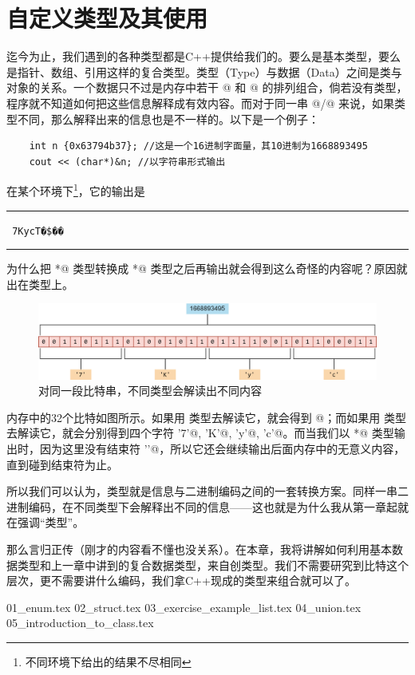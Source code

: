 \chapter{自定义类型及其使用}
迄今为止，我们遇到的各种类型都是C++提供给我们的。要么是基本类型，要么是指针、数组、引用这样的复合类型。类型（Type）与数据（Data）之间是类与对象的关系。一个数据只不过是内存中若干 @ 和 @ 的排列组合，倘若没有类型，程序就不知道如何把这些信息解释成有效内容。而对于同一串 @/@ 来说，如果类型不同，那么解释出来的信息也是不一样的。以下是一个例子：
\begin{lstlisting}
    int n {0x63794b37}; //这是一个16进制字面量，其10进制为1668893495
    cout << (char*)&n; //以字符串形式输出
\end{lstlisting}
在某个环境下\footnote{不同环境下给出的结果不尽相同}，它的输出是\\\noindent\rule{\linewidth}{.2pt}\texttt{
7KycT�\$��
}\\\noindent\rule{\linewidth}{.2pt}
为什么把 \lstinline@int*@ 类型转换成 \lstinline@char*@ 类型之后再输出就会得到这么奇怪的内容呢？原因就出在类型上。\par
\begin{figure}[htbp]
    \centering
    \includegraphics[width=\textwidth]{../images/generalized_parts/06_0_1_string_to_int_or_char.drawio.png}
    \caption{对同一段比特串，不同类型会解读出不同内容}
\end{figure}
内存中的32个比特如图所示。如果用 \lstinline@int@ 类型去解读它，就会得到 @；而如果用 \lstinline@char@ 类型去解读它，就会分别得到四个字符 \lstinline@'7'@, \lstinline@'K'@, \lstinline@'y'@, \lstinline@'c'@。而当我们以 \lstinline@char*@ 类型输出时，因为这里没有结束符 \lstinline@'\0'@，所以它还会继续输出后面内存中的无意义内容，直到碰到结束符为止。\par
所以我们可以认为，类型就是信息与二进制编码之间的一套转换方案。同样一串二进制编码，在不同类型下会解释出不同的信息——这也就是为什么我从第一章起就在强调``类型''。\par
那么言归正传（刚才的内容看不懂也没关系）。在本章，我将讲解如何利用基本数据类型和上一章中讲到的复合数据类型，来自创类型。我们不需要研究到比特这个层次，更不需要讲什么编码，我们拿C++现成的类型来组合就可以了。\par
{01_enum.tex}
{02_struct.tex}
{03_exercise_example_list.tex}
{04_union.tex}
{05_introduction_to_class.tex}
